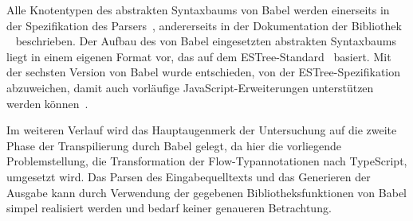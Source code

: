 Alle Knotentypen des abstrakten Syntaxbaums von Babel werden einerseits in der Spezifikation des Parsers~\autocite{BABEL:PARSER_SPEC,BABEL:PARSER}, andererseits in der Dokumentation der Bibliothek ~\autocite{BABEL:TYPES} beschrieben.
Der Aufbau des von Babel eingesetzten abstrakten Syntaxbaums liegt in einem eigenen Format vor, das auf dem ESTree-Standard~\autocite{ESTREE_SPEC} basiert. Mit der sechsten Version von Babel wurde entschieden, von der ESTree-Spezifikation abzuweichen, damit auch vorläufige JavaScript-Erweiterungen unterstützen werden können~\autocite{BABEL:STATE_OF_BABEL}.

Im weiteren Verlauf wird das Hauptaugenmerk der Untersuchung auf die zweite Phase der Transpilierung durch Babel gelegt, da hier die vorliegende Problemstellung, die Transformation der Flow-Typannotationen nach TypeScript, umgesetzt wird. Das Parsen des Eingabequelltexts und das Generieren der Ausgabe kann durch Verwendung der gegebenen Bibliotheksfunktionen von Babel simpel realisiert werden und bedarf keiner genaueren Betrachtung.
